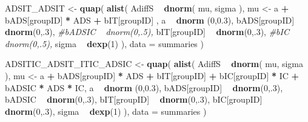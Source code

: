 \documentclass[10pt,dvipsnames,enabledeprecatedfontcommands]{scrartcl}
\newenvironment{Shaded}{\begin{snugshade}}{\end{snugshade}}
\newcommand{\CommentTok}[1]{\textcolor[rgb]{0.56,0.35,0.01}{\textit{#1}}}
\newcommand{\DataTypeTok}[1]{\textcolor[rgb]{0.13,0.29,0.53}{#1}}
\newcommand{\DecValTok}[1]{\textcolor[rgb]{0.00,0.00,0.81}{#1}}
\newcommand{\FloatTok}[1]{\textcolor[rgb]{0.00,0.00,0.81}{#1}}
\newcommand{\KeywordTok}[1]{\textcolor[rgb]{0.13,0.29,0.53}{\textbf{#1}}}
\newcommand{\NormalTok}[1]{#1}
\newcommand{\OperatorTok}[1]{\textcolor[rgb]{0.81,0.36,0.00}{\textbf{#1}}}
\newcommand{\StringTok}[1]{\textcolor[rgb]{0.31,0.60,0.02}{#1}}
\begin{document}
\begin{Shaded}
\begin{Highlighting}[]
\NormalTok{ADSIT_ADSIT <-}\StringTok{ }\KeywordTok{quap}\NormalTok{(}
  \KeywordTok{alist}\NormalTok{(}
\NormalTok{    AdiffS }\OperatorTok{~}\StringTok{ }\KeywordTok{dnorm}\NormalTok{( mu, sigma ),}
\NormalTok{    mu <-}\StringTok{ }\NormalTok{a }\OperatorTok{+}\StringTok{ }\NormalTok{bADS[groupID] }\OperatorTok{*}\StringTok{ }\NormalTok{ADS }\OperatorTok{+}\StringTok{  }\NormalTok{bIT[groupID] ,}
\NormalTok{    a }\OperatorTok{~}\StringTok{ }\KeywordTok{dnorm}\NormalTok{ (}\DecValTok{0}\NormalTok{,}\FloatTok{0.3}\NormalTok{),}
\NormalTok{    bADS[groupID] }\OperatorTok{~}\StringTok{ }\KeywordTok{dnorm}\NormalTok{(}\DecValTok{0}\NormalTok{,.}\DecValTok{3}\NormalTok{),}
    \CommentTok{#bADSIC ~ dnorm(0,.5),}
\NormalTok{    bIT[groupID] }\OperatorTok{~}\StringTok{ }\KeywordTok{dnorm}\NormalTok{(}\DecValTok{0}\NormalTok{,.}\DecValTok{3}\NormalTok{),}
    \CommentTok{#bIC ~ dnorm(0,.5),}
\NormalTok{    sigma  }\OperatorTok{~}\StringTok{ }\KeywordTok{dexp}\NormalTok{(}\DecValTok{1}\NormalTok{)}
\NormalTok{  ), }
  \DataTypeTok{data =}\NormalTok{ summaries}
\NormalTok{)}


\NormalTok{ADSITIC_ADSIT_ITIC_ADSIC <-}\StringTok{ }\KeywordTok{quap}\NormalTok{(}
  \KeywordTok{alist}\NormalTok{(}
\NormalTok{    AdiffS }\OperatorTok{~}\StringTok{ }\KeywordTok{dnorm}\NormalTok{( mu, sigma ),}
\NormalTok{    mu <-}\StringTok{ }\NormalTok{a }\OperatorTok{+}\StringTok{ }\NormalTok{bADS[groupID] }\OperatorTok{*}\StringTok{ }\NormalTok{ADS }\OperatorTok{+}\StringTok{  }\NormalTok{bIT[groupID] }\OperatorTok{+}\StringTok{ }\NormalTok{bIC[groupID] }\OperatorTok{*}\StringTok{ }\NormalTok{IC }\OperatorTok{+}
\StringTok{      }\NormalTok{bADSIC }\OperatorTok{*}\StringTok{ }\NormalTok{ADS }\OperatorTok{*}\StringTok{ }\NormalTok{IC,}
\NormalTok{    a }\OperatorTok{~}\StringTok{ }\KeywordTok{dnorm}\NormalTok{ (}\DecValTok{0}\NormalTok{,}\FloatTok{0.3}\NormalTok{),}
\NormalTok{    bADS[groupID] }\OperatorTok{~}\StringTok{ }\KeywordTok{dnorm}\NormalTok{(}\DecValTok{0}\NormalTok{,.}\DecValTok{3}\NormalTok{),}
\NormalTok{    bADSIC }\OperatorTok{~}\StringTok{ }\KeywordTok{dnorm}\NormalTok{(}\DecValTok{0}\NormalTok{,.}\DecValTok{3}\NormalTok{),}
\NormalTok{    bIT[groupID] }\OperatorTok{~}\StringTok{ }\KeywordTok{dnorm}\NormalTok{(}\DecValTok{0}\NormalTok{,.}\DecValTok{3}\NormalTok{),}
\NormalTok{    bIC[groupID] }\OperatorTok{~}\StringTok{ }\KeywordTok{dnorm}\NormalTok{(}\DecValTok{0}\NormalTok{,.}\DecValTok{3}\NormalTok{),}
\NormalTok{    sigma  }\OperatorTok{~}\StringTok{ }\KeywordTok{dexp}\NormalTok{(}\DecValTok{1}\NormalTok{)}
\NormalTok{  ), }
  \DataTypeTok{data =}\NormalTok{ summaries}
\NormalTok{)}



\end{Highlighting}
\end{Shaded}
\end{document}
